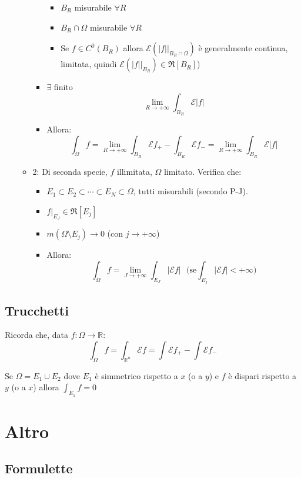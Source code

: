 \documentclass[a4paper,12pt]{article}
\begin{document}
\begin{itemize}
\begin{itemize}
\begin{itemize}
\begin{itemize}
    \item $B_R$ misurabile $\forall R$
    \item $B_R\cap\Omega$ misurabile $\forall R$
    \item Se $f \in C^0(B_R)$ allora $\mathcal{E}(|f||_{B_R\cap\Omega})$ è generalmente continua, limitata, quindi $\mathcal{E}(|f||_{B_R}) \in \Re[B_R]$)
   \end{itemize}
   \item $\exists$ finito $$\lim_{R \to +\infty} \int_{B_R} \mathcal{E}|f| $$
   \item Allora: $$\int_\Omega f = \lim_{R \to +\infty} \int_{B_R} \mathcal{E}f_+ - \int_{B_R} \mathcal{E}f_- = \lim_{R \to +\infty} \int_{B_R} \mathcal{E}|f|$$
  \end{itemize}
  \item 2: Di seconda specie, $f$ illimitata, $\Omega$ limitato. Verifica che:
  \begin{itemize}
   \item $E_1 \subset E_2 \subset \cdots \subset E_N \subset \Omega$, tutti misurabili (secondo P-J).
   \item $f|_{E_J} \in \Re[E_j]$
   \item $m(\Omega\setminus E_j) \to 0$ (con $j \to +\infty$)
   \item Allora: $$\int_\Omega f = \lim_{J \to +\infty} \int_{E_J} |\mathcal{E}f|\ \ \ \mathrm{(se}\int_{E_j}|\mathcal{E}f| < +\infty\mathrm{)}$$
  \end{itemize}
 \end{itemize}
\end{itemize}

\subsection{Trucchetti}
Ricorda che, data $f: \Omega \rightarrow \mathbb{R}$:
 $$\int_\Omega f = \int_{\mathbb{R}^n} \mathcal{E}f = \int \mathcal{E}f_+ - \int \mathcal{E}f_- $$

Se $\Omega=E_1\cup E_2$ dove $E_1$ è simmetrico rispetto a $x$ (o a $y$) e $f$ è dispari rispetto a $y$ (o a $x$) allora $\int_{E_1} f = 0$

\section{Altro}
\subsection{Formulette}
\end{document}
